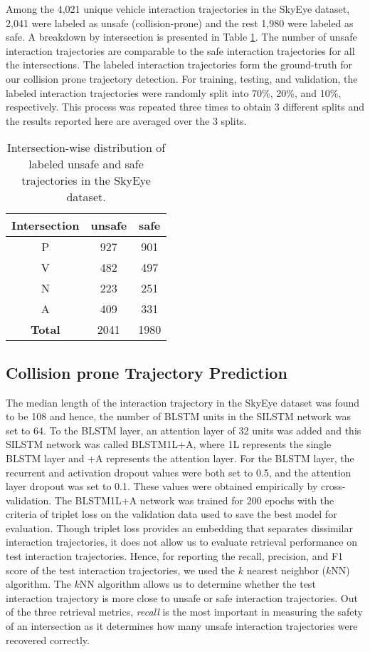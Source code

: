 \documentclass[final,journal]{IEEEtran}
\begin{document}
Among the 4,021 unique vehicle interaction trajectories in the SkyEye dataset, 2,041 were labeled as unsafe (collision-prone) and the rest 1,980 were labeled as safe. A breakdown by intersection is presented in Table \ref{labeling_breakdown}. The number of unsafe interaction trajectories are comparable to the safe interaction trajectories for all the intersections.  The labeled interaction trajectories form the ground-truth for our collision prone trajectory detection. For training, testing, and validation, the labeled interaction trajectories were randomly split into 70\%, 20\%, and 10\%, respectively. This process was repeated three times to obtain 3 different splits and the results reported here are averaged over the 3 splits. 
\begin{table}[]
    \centering
       \caption{Intersection-wise distribution of labeled unsafe and safe trajectories in the SkyEye dataset.}
    \label{labeling_breakdown}
    \begin{tabular}{|c|c|c|}
\hline
\textbf{Intersection} & \textbf{unsafe} & \textbf{safe} \\ \hline
P & 927 & 901 \\ \hline
V & 482 & 497\\ \hline
N & 223 & 251 \\ \hline
A & 409 & 331 \\ \hline
\textbf{Total} & 2041 & 1980\\ \hline
\end{tabular}
\end{table}
\subsection{Collision prone Trajectory Prediction}
The median length of the interaction trajectory in the SkyEye dataset was found to be 108 and hence, the number of BLSTM units in the SILSTM network was set to 64. To the BLSTM layer, an attention layer of 32 units was added and this SILSTM network was called BLSTM1L+A, where 1L represents the single BLSTM layer and +A represents the attention layer. For the BLSTM layer, the recurrent and activation dropout values were both set to 0.5, and the attention layer dropout was set to 0.1. These values were obtained empirically by cross-validation. The BLSTM1L+A network was trained for 200 epochs with the criteria of triplet loss on the validation data used to save the best model for evaluation. Though triplet loss provides an embedding that separates dissimilar interaction trajectories, it does not allow us to evaluate retrieval performance on test interaction trajectories. Hence, for reporting the recall, precision, and  F1 score of the test interaction trajectories, we used the $k$ nearest neighbor ($k$NN) algorithm. The $k$NN algorithm allows us to determine whether the test interaction trajectory is more close to unsafe or safe interaction trajectories. Out of the three retrieval metrics, \textit{recall} is the most important in measuring the safety of an intersection as it determines how many unsafe interaction trajectories were recovered correctly.
\end{document}

